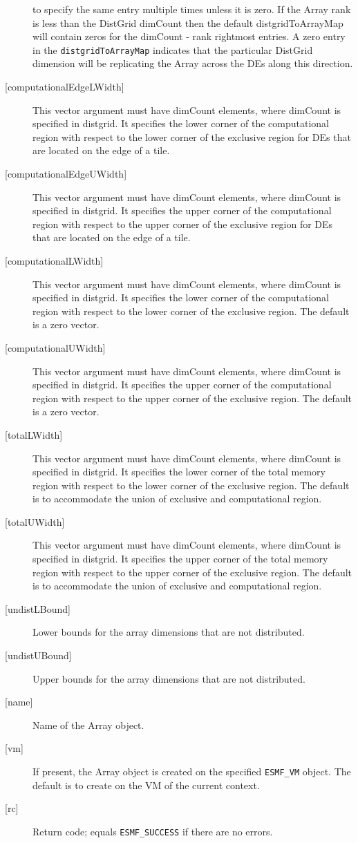 \begin{description}
   to specify the same entry multiple times unless it is zero.
   If the Array rank is less than the DistGrid dimCount then the default
   distgridToArrayMap will contain zeros for the dimCount - rank
   rightmost entries. A zero entry in the {\tt distgridToArrayMap}
   indicates that the particular DistGrid dimension will be replicating
   the Array across the DEs along this direction.
   \item[{[computationalEdgeLWidth]}]
   This vector argument must have dimCount elements, where dimCount is
   specified in distgrid. It specifies the lower corner of the computational
   region with respect to the lower corner of the exclusive region for DEs
   that are located on the edge of a tile.
   \item[{[computationalEdgeUWidth]}]
   This vector argument must have dimCount elements, where dimCount is
   specified in distgrid. It specifies the upper corner of the computational
   region with respect to the upper corner of the exclusive region for DEs
   that are located on the edge of a tile.
   \item[{[computationalLWidth]}]
   This vector argument must have dimCount elements, where dimCount is
   specified in distgrid. It specifies the lower corner of the computational
   region with respect to the lower corner of the exclusive region.
   The default is a zero vector.
   \item[{[computationalUWidth]}]
   This vector argument must have dimCount elements, where dimCount is
   specified in distgrid. It specifies the upper corner of the computational
   region with respect to the upper corner of the exclusive region.
   The default is a zero vector.
   \item[{[totalLWidth]}]
   This vector argument must have dimCount elements, where dimCount is
   specified in distgrid. It specifies the lower corner of the total memory
   region with respect to the lower corner of the exclusive region.
   The default is to accommodate the union of exclusive and computational
   region.
   \item[{[totalUWidth]}]
   This vector argument must have dimCount elements, where dimCount is
   specified in distgrid. It specifies the upper corner of the total memory
   region with respect to the upper corner of the exclusive region.
   The default is to accommodate the union of exclusive and computational
   region.
   \item[{[undistLBound]}]
   Lower bounds for the array dimensions that are not distributed.
   \item[{[undistUBound]}]
   Upper bounds for the array dimensions that are not distributed.
   \item[{[name]}]
   Name of the Array object.
   \item[{[vm]}]
   If present, the Array object is created on the specified
   {\tt ESMF\_VM} object. The default is to create on the VM of the
   current context.
   \item[{[rc]}]
   Return code; equals {\tt ESMF\_SUCCESS} if there are no errors.
   \end{description}
   
